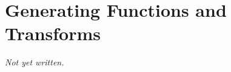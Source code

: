 \chapter{Generating Functions and Transforms}\label{ch:generating-functions}


\textit{Not yet written.}
